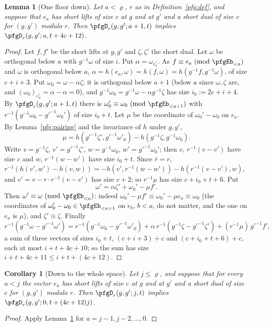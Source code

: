 \documentclass[10pt]{amsart}
\newtheorem{lemma}[theorem]{Lemma}
\newtheorem{corollary}[theorem]{Corollary}
\theoremstyle{definition}
\theoremstyle{remark}
\begin{document}
\begin{lemma}[One floor down]\label{pfg:step}
Let $a<\varrho$, $r$ as in Definition~\ref{pfg:def}, and suppose that $e_a$ has short lifts of size $c$ at
$g$ and at $g'$ and a short dual of size $c$ for $(g,g')$ modulo $r$. Then
$\pfgD_r(g,g';a+1,t)$ implies $\pfgD_r(g,g';a,t+4c+12)$.
\end{lemma}
\begin{proof}
Let $f,f'$ be the short lifts at $g,g'$ and $\zeta,\zeta'$ the short dual. Let $\omega$ be orthogonal below $a$
with $g^{-1}\omega$ of size $i$. Put $\alpha=\omega_{e^*_a}$. As $f\equiv e_a\ (\mathrm{mod}\ \pfgEb_{<a})$ and
$\omega$ is orthogonal below $a$, $\alpha=h(e_a,\omega)=h(f,\omega)=h(g^{-1}f,g^{-1}\omega)$, of size $c+i+3$.
Put $\omega_0=\omega-\alpha\zeta$; it is orthogonal below $a+1$ (below $a$ since $\omega,\zeta$ are, and
$(\omega_0)_{e^*_a}=\alpha-\alpha=0$), and $g^{-1}\omega_0=g^{-1}\omega-\alpha g^{-1}\zeta$ has size
$i_0:=2c+i+4$. By $\pfgD_r(g,g';a+1,t)$ there is $\omega_0'\equiv\omega_0\ (\mathrm{mod}\ \pfgEb_{<a+1})$ with
$r^{-1}(g^{-1}\omega_0-g'^{-1}\omega_0')$ of size $i_0+t$. Let $\mu$ be the coordinate of $\omega_0'-\omega_0$ on
$e_a$. By Lemma~\ref{pfg:pairing} and the invariance of $h$ under $g,g'$,
\[
\mu=h(g'^{-1}\zeta',g'^{-1}\omega'_0)-h(g^{-1}\zeta,g^{-1}\omega_0).
\]
Write $v=g^{-1}\zeta$, $v'=g'^{-1}\zeta'$, $w=g^{-1}\omega_0$, $w'=g'^{-1}\omega_0'$; then $v$, $r^{-1}(v-v')$ have
size $c$ and $w$, $r^{-1}(w-w')$ have size $i_0+t$. Since $\bar r=r$,
$r^{-1}(h(v',w')-h(v,w))=-h(v',r^{-1}(w-w'))-h(r^{-1}(v-v'),w)$, and $v'=v-r\cdot r^{-1}(v-v')$ has size $c+2$; so
$r^{-1}\mu$ has size $c+i_0+t+6$. Put
\[
\omega'=\alpha\zeta'+\omega_0'-\mu f' .
\]
Then $\omega'\equiv\omega\ (\mathrm{mod}\ \pfgEb_{<a})$: indeed $\omega_0'-\mu f'\equiv\omega_0'-\mu e_a\equiv\omega_0$
(the coordinates of $\omega_0'-\omega_0\in\pfgEb_{<a+1}$ on $e_b$, $b<a$, do not matter, and the one on $e_a$ is
$\mu$), and $\zeta'\equiv\zeta$. Finally
\[
r^{-1}(g^{-1}\omega-g'^{-1}\omega')=r^{-1}(g^{-1}\omega_0-g'^{-1}\omega'_0)+\alpha\,r^{-1}(g^{-1}\zeta-g'^{-1}\zeta')
+(r^{-1}\mu)\,g'^{-1}f' ,
\]
a sum of three vectors of sizes $i_0+t$, $(c+i+3)+c$ and $(c+i_0+t+6)+c$, each at most
$i+t+4c+10$; so the sum has size $i+t+4c+11\le i+t+(4c+12)$.
\end{proof}

\begin{corollary}[Down to the whole space]\label{pfg:whole}
Let $j\le\varrho$, and suppose that for every $a<j$ the vector $e_a$ has short lifts of size $c$ at $g$ and at
$g'$ and a short dual of size $c$ for $(g,g')$ modulo $r$. Then $\pfgD_r(g,g';j,t)$ implies
$\pfgD_r(g,g';0,t+(4c+12)j)$.
\end{corollary}
\begin{proof}
Apply Lemma~\ref{pfg:step} for $a=j-1,j-2,\dots,0$.
\end{proof}
\end{document}
